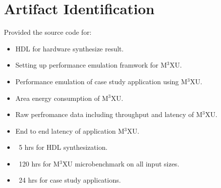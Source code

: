 \documentclass[conference]{IEEEtran}
\newcommand{\MPCMXU}[1]{M$^{3}$XU}
\begin{document}
\section{Artifact Identification}


\newartifact

\artrel
Provided the source code for:
\begin{itemize}
    \item HDL for hardware synthesize result.
    \item Setting up performance emulation framwork for \MPCMXU{}.
    \item Performance emulation of case study application using \MPCMXU{}.
\end{itemize}

\artexp
\begin{itemize}
    \item Area energy consumption of \MPCMXU{}.
    \item Raw perfromance data including throughput and latency of \MPCMXU{}.
    \item End to end latency of application \MPCMXU{}.
\end{itemize}


\arttime
\begin{itemize}
    \item ~5 hrs for HDL synthesization.
    \item ~120 hrs for \MPCMXU{} microbenchmark on all input sizes.
    \item ~24 hrs for case study applications.
\end{itemize}
\end{document}
